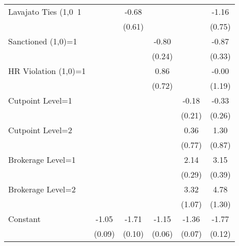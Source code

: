 {\begin{tabular}{l*{5}{c}}
Lavajato Ties (1,0~1&                    &       -0.68        &                    &                    &       -1.16        \\
                    &                    &      (0.61)        &                    &                    &      (0.75)        \\
Sanctioned (1,0)=1  &                    &                    &       -0.80\sym{**}&                    &       -0.87\sym{**}\\
                    &                    &                    &      (0.24)        &                    &      (0.33)        \\
HR Violation (1,0)=1&                    &                    &        0.86        &                    &       -0.00        \\
                    &                    &                    &      (0.72)        &                    &      (1.19)        \\
Cutpoint Level=1    &                    &                    &                    &       -0.18        &       -0.33        \\
                    &                    &                    &                    &      (0.21)        &      (0.26)        \\
Cutpoint Level=2    &                    &                    &                    &        0.36        &        1.30        \\
                    &                    &                    &                    &      (0.77)        &      (0.87)        \\
Brokerage Level=1   &                    &                    &                    &        2.14\sym{**}&        3.15\sym{**}\\
                    &                    &                    &                    &      (0.29)        &      (0.39)        \\
Brokerage Level=2   &                    &                    &                    &        3.32\sym{**}&        4.78\sym{**}\\
                    &                    &                    &                    &      (1.07)        &      (1.30)        \\
Constant            &       -1.05\sym{**}&       -1.71\sym{**}&       -1.15\sym{**}&       -1.36\sym{**}&       -1.77\sym{**}\\
                    &      (0.09)        &      (0.10)        &      (0.06)        &      (0.07)        &      (0.12)        \\


\end{tabular}}
